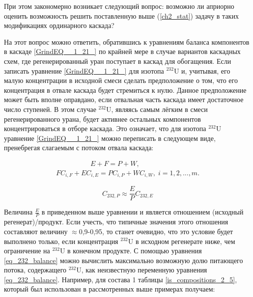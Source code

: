 При этом закономерно возникает следующий вопрос: возможно ли априорно оценить возможность решить поставленную выше (\ref{ch2_stat}) задачу в таких модификациях ординарного каскада? 

На этот вопрос можно ответить, обратившись к уравнениям баланса компонентов в каскаде \ref{GrindEQ__1_21_} по крайней мере в случае вариантов каскадных схем, где регенерированный уран поступает в каскад для обогащения. Если записать уравнение \ref{GrindEQ__1_21_} для изотопа $^{232}$U и, учитывая, его малую концентрации в исходной смеси сделать предположение о том, что его концентрация в отвале каскада будет стремиться к нулю. Данное предположение может быть вполне оправдано, если отвальная часть каскада имеет достаточное число ступеней. В этом случае $^{232}$U, являясь самым лёгким в смеси регенерированного урана, будет активнее остальных компонентов концентрироваться в отборе каскада. Это означает, что для изотопа $^{232}$U уравнение \ref{GrindEQ__1_21_} можно переписать в следующем виде, пренебрегая слагаемым с потоком отвала каскада:

\begin{equation} \label{GrindEQ__1_21__} 
  \begin{array}{l} {\quad \quad \quad \quad \quad  E+F=P+W,} \\ {FC_{i,F} + EC_{i,E} =PC_{i,P} +WC_{i,W} ,\;  i=1,2,...,m.} \end{array} 
\end{equation} 


\begin{equation}
  \label{eq_232_balance_}
    C_{232,P} \approx \frac{E}{P} C_{232,E}
  \end{equation}

Величина $\frac{E}{P}$ в приведенном выше уравнении и является отношением (исходный регенерат)/продукт. Если учесть, что типичные значения этого отношения составляют величину $\approx$0,9-0,95, то станет очевидно, что это условие будет выполнено только, если концентрация $^{232}$U в исходном регенерате ниже, чем ограничение на $^{232}$U в конечном продукте. 
С помощью уравнения \ref{eq_232_balance} можно вычислить максимально возможную долю питающего потока, содержащего $^{232}$U, как неизвестную переменную уравнения \ref{eq_232_balance}. Например, для состава 1 таблицы \ref{is_compositions_2_5}, который был использован в рассмотренных выше примерах получаем:

